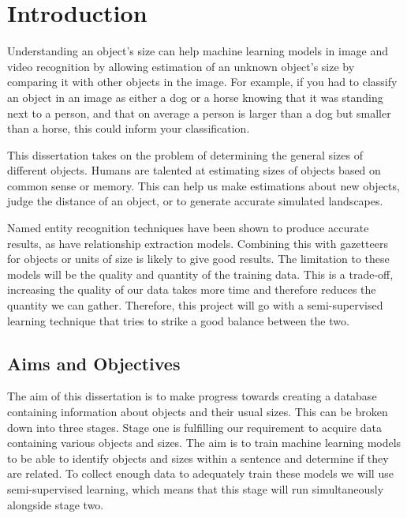 \documentclass[11pt,oneside]{book}
\begin{document}
\tableofcontents
\listoffigures
\listoftables



\mainmatter

\chapter{Introduction}

Understanding an object's size can help machine learning models in image and video recognition by allowing estimation of an unknown object's size by comparing it with other objects in the image. For example, if you had to classify an object in an image as either a dog or a horse knowing that it was standing next to a person, and that on average a person is larger than a dog but smaller than a horse, this could inform your classification.

This dissertation takes on the problem of determining the general sizes of different objects. Humans are talented at estimating sizes of objects based on common sense or memory. This can help us make estimations about new objects, judge the distance of an object, or to generate accurate simulated landscapes.

Named entity recognition techniques have been shown to produce accurate results, as have relationship extraction models. Combining this with gazetteers for objects or units of size is likely to give good results. The limitation to these models will be the quality and quantity of the training data. This is a trade-off, increasing the quality of our data takes more time and therefore reduces the quantity we can gather. Therefore, this project will go with a semi-supervised learning technique that tries to strike a good balance between the two.

\section{Aims and Objectives}

The aim of this dissertation is to make progress towards creating a database containing information about objects and their usual sizes. This can be broken down into three stages. Stage one is fulfilling our requirement to acquire data containing various objects and sizes. The aim is to train machine learning models to be able to identify objects and sizes within a sentence and determine if they are related. To collect enough data to adequately train these models we will use semi-supervised learning, which means that this stage will run simultaneously alongside stage two.
\end{document}
